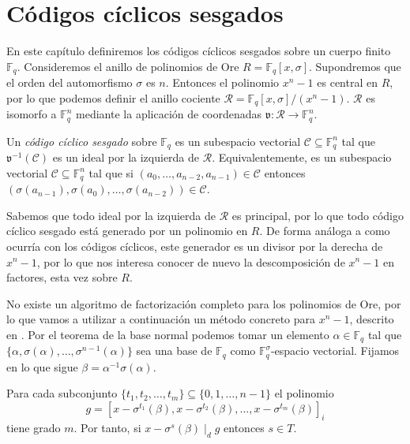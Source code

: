 \chapter{Códigos cíclicos sesgados}

En este capítulo definiremos los códigos cíclicos sesgados sobre un cuerpo finito \(\mathbb F_q\).
Consideremos el anillo de polinomios de Ore \(R = \mathbb F_q[x, \sigma]\).
Supondremos que el orden del automorfismo \(\sigma\) es \(n\).
Entonces el polinomio \(x^n - 1\) es central en \(R\), por lo que podemos definir el anillo cociente \(\mathcal R = \mathbb F_q[x, \sigma]/(x^n - 1)\).
\(\mathcal R\) es isomorfo a \(\mathbb F_q^n\) mediante la aplicación de coordenadas \(\mathfrak v : \mathcal R \to \mathbb F_q^n\).

\begin{definition}
  Un \emph{código cíclico sesgado} sobre \(\mathbb F_q\) es un subespacio vectorial \(\mathcal C \subseteq \mathbb F_q^n\) tal que \(\mathfrak v^{-1}(\mathcal C)\) es un ideal por la izquierda de \(\mathcal R\).
  Equivalentemente, es un subespacio vectorial \(\mathcal C \subseteq \mathbb F_q^n\) tal que si \((a_0, \dots, a_{n-2}, a_{n-1}) \in \mathcal C\) entonces \((\sigma(a_{n-1}), \sigma(a_0), \dots, \sigma(a_{n-2})) \in \mathcal C\).
\end{definition}

Sabemos que todo ideal por la izquierda de \(\mathcal R\) es principal, por lo que todo código cíclico sesgado está generado por un polinomio en \(R\).
De forma análoga a como ocurría con los códigos cíclicos, este generador es un divisor por la derecha de \(x^n - 1\), por lo que nos interesa conocer de nuevo la descomposición de \(x^n - 1\) en factores, esta vez sobre \(R\).

No existe un algoritmo de factorización completo para los polinomios de Ore, por lo que vamos a utilizar a continuación un método concreto para \(x^n - 1\), descrito en \parencite{gomez-torrecillas_new_2016}.
Por el teorema de la base normal podemos tomar un elemento \(\alpha \in \mathbb F_q\) tal que \(\{\alpha, \sigma(\alpha), \dots, \sigma^{n-1}(\alpha)\}\) sea una base de  \(\mathbb F_q\) como \(\mathbb F_q^{\sigma}\)-espacio vectorial.
Fijamos en lo que sigue \(\beta = \alpha^{-1}\sigma(\alpha)\).

\begin{lemma}
  \label{lem:pol-t-beta}
  Para cada subconjunto \(\{t_1, t_2, \dots, t_m\} \subseteq \{0, 1, \dots, n - 1\}\) el polinomio 
  \[
    g = \left[x - \sigma^{t_1}(\beta), x - \sigma^{t_{2}}(\beta), \dots, x - \sigma^{t_m}(\beta)\right]_{i}
  \]
  tiene grado \(m\).
  Por tanto, si \(x - \sigma^s(\beta) \mid_d g\) entonces \(s \in T\).
\end{lemma}

